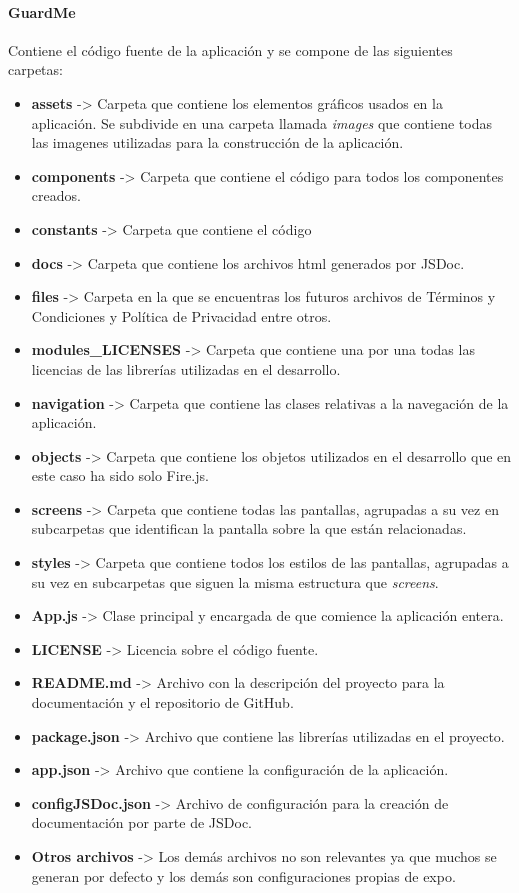 \documentclass[11pt]{report} %
\begin{document}
\paragraph*{GuardMe}
Contiene el código fuente de la aplicación y se compone de las siguientes carpetas:
\begin{itemize}
	\item \textbf{assets} -> Carpeta que contiene los elementos gráficos usados en la aplicación. Se subdivide en una carpeta llamada \textit{images} que contiene todas las imagenes utilizadas para la construcción de la aplicación.
	\item \textbf{components} -> Carpeta que contiene el código para todos los componentes creados.
	\item \textbf{constants} -> Carpeta que contiene el código
	\item \textbf{docs} -> Carpeta que contiene los archivos html generados por JSDoc.
	\item \textbf{files} -> Carpeta en la que se encuentras los futuros archivos de Términos y Condiciones y Política de Privacidad entre otros.
	\item \textbf{modules\_LICENSES} -> Carpeta que contiene una por una todas las licencias de las librerías utilizadas en el desarrollo.
	\item \textbf{navigation} -> Carpeta que contiene las clases relativas a la navegación de la aplicación.
	\item \textbf{objects} -> Carpeta que contiene los objetos utilizados en el desarrollo que en este caso ha sido solo Fire.js.
	\item \textbf{screens} -> Carpeta que contiene todas las pantallas, agrupadas a su vez en subcarpetas que identifican la pantalla sobre la que están relacionadas.
	\item \textbf{styles} -> Carpeta que contiene todos los estilos de las pantallas, agrupadas a su vez en subcarpetas que siguen la misma estructura que \textit{screens}.
	\item \textbf{App.js} -> Clase principal y encargada de que comience la aplicación entera.
	\item \textbf{LICENSE} -> Licencia sobre el código fuente.
	\item \textbf{README.md} -> Archivo con la descripción del proyecto para la documentación y el repositorio de GitHub.
	\item \textbf{package.json} -> Archivo que contiene las librerías utilizadas en el proyecto.
	\item \textbf{app.json} -> Archivo que contiene la configuración de la aplicación.
	\item \textbf{configJSDoc.json} -> Archivo de configuración para la creación de documentación por parte de JSDoc.
	\item \textbf{Otros archivos} -> Los demás archivos no son relevantes ya que muchos se generan por defecto y los demás son configuraciones propias de expo.
\end{itemize}

\newpage
\nocite{*} %
 


\newpage
\end{document}
